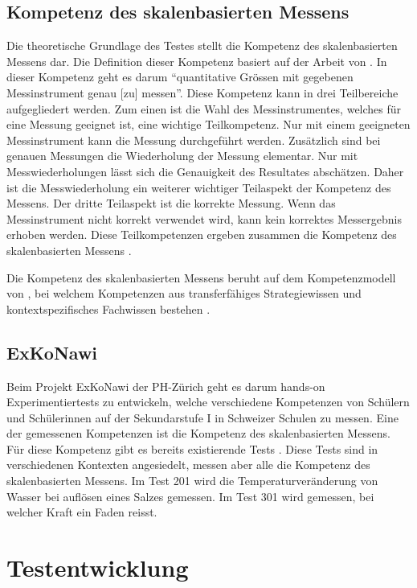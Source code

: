 
\subsection{Kompetenz des skalenbasierten Messens}

Die theoretische Grundlage des Testes stellt die Kompetenz des skalenbasierten Messens dar. Die Definition dieser Kompetenz basiert auf der Arbeit von \citet{Munier2013}. In dieser Kompetenz geht es darum  "`quantitative Grössen mit gegebenen Messinstrument genau [zu] messen"'\citep{Gut2013a}. Diese Kompetenz kann in drei Teilbereiche aufgegliedert werden. Zum einen ist die Wahl des Messinstrumentes, welches für eine Messung geeignet ist, eine wichtige Teilkompetenz. Nur mit einem geeigneten Messinstrument kann die Messung durchgeführt werden. Zusätzlich sind bei genauen Messungen die Wiederholung der Messung elementar. Nur mit Messwiederholungen lässt sich die Genauigkeit des Resultates abschätzen. Daher ist die Messwiederholung ein weiterer wichtiger Teilaspekt der Kompetenz des Messens. Der dritte Teilaspekt ist die korrekte Messung. Wenn das Messinstrument nicht korrekt verwendet wird, kann kein korrektes Messergebnis erhoben werden. Diese Teilkompetenzen ergeben zusammen die Kompetenz des skalenbasierten Messens \citep{Munier2013,Gut2013a}.

Die Kompetenz des skalenbasierten Messens beruht auf dem Kompetenzmodell von \citet{Gott1996}, bei welchem Kompetenzen aus transferfähiges Strategiewissen und kontextspezifisches Fachwissen bestehen \citet{Gott2002}.

\subsection{ExKoNawi}

Beim Projekt ExKoNawi der PH-Zürich \citep{Metzger2013} geht es darum hands-on Experimentiertests zu entwickeln, welche verschiedene Kompetenzen von Schülern und Schülerinnen auf der Sekundarstufe I in Schweizer Schulen zu messen. Eine der gemessenen Kompetenzen ist die Kompetenz des skalenbasierten Messens. Für diese Kompetenz gibt es bereits existierende Tests \citep{Metzger2013, Gut2013a, Hild2014a, Hild2014}. Diese Tests sind in verschiedenen Kontexten angesiedelt, messen aber alle die Kompetenz des skalenbasierten Messens. Im Test 201 wird die Temperaturveränderung von Wasser bei auflösen eines Salzes gemessen. Im Test 301 wird gemessen, bei welcher Kraft ein Faden reisst.


\section{Testentwicklung}

